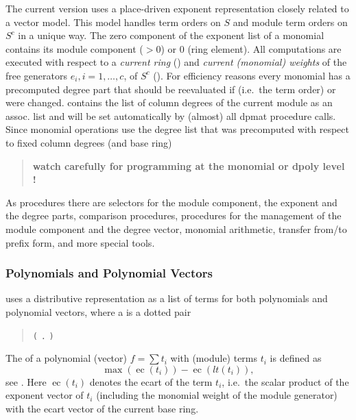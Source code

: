 The current version uses a place-driven exponent representation
closely related to a vector model. This model handles term orders  on $S$
and module term orders on $S^c$ in a unique way. The zero component of the
exponent list of a monomial contains its module component ($>0$) or 0
(ring element). All computations are executed with respect to a
\emph{current ring}
()
and \emph{current (monomial) weights} of the free generators
$e_i, i=1,\ldots,c$, of $S^c$
().
For efficiency reasons every monomial has a
precomputed degree part that should be reevaluated if 
(i.e.\ the term order) or  were
changed.  contains the list of column degrees of
the current module as an assoc. list and will be set automatically by
(almost) all dpmat procedure calls. Since monomial operations use the
degree list that was precomputed with respect to fixed column degrees
(and base ring)
\begin{quote}
\textbf{watch carefully for  programming at the monomial
or dpoly level !}
\end{quote}

As procedures there are selectors for the module component, the exponent and
the degree parts, comparison procedures, procedures for the management of
the module component and the degree vector, monomial arithmetic, transfer
from/to prefix form, and more special tools.

\subsubsection{Polynomials and Polynomial Vectors}

 uses a distributive representation as a list of terms for both
polynomials and polynomial vectors, where a  is a dotted
pair
\begin{quote}
  \texttt{(} \texttt{.} \texttt{)}
\end{quote}
The  of a polynomial (vector) $f=\sum{t_i}$ with (module)
terms $t_i$ is defined as \[\max(\mathop{\mathrm{ec}}(t_i))-\mathop{\mathrm{ec}}(lt(t_i)),\] see
\cite{Graebe:94}. Here $\mathop{\mathrm{ec}}(t_i)$ denotes the ecart of the term $t_i$, i.e.\
the scalar product of the exponent vector of $t_i$ (including the
monomial weight of the module generator) with the ecart vector of the
current base ring.

